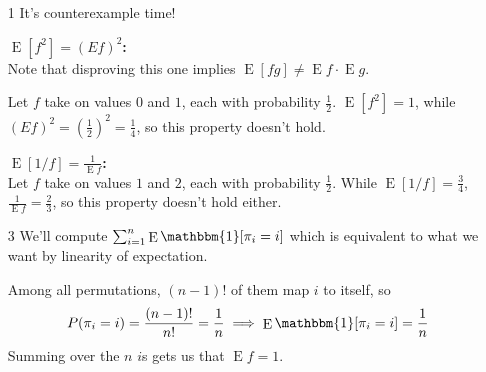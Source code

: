 \documentclass[12pt]{article}
\DeclareMathOperator{\E}{E}
\begin{document}
\begin{enumerate}
    \item[1] It's counterexample time!

        \textbf{$\E \left[f^2\right] = \left(E f\right)^2$:} \\
        Note that disproving this one implies  $\E [fg] \ne \E f \cdot \E g$.

        Let $f$ take on values $0$ and $1$, each with probability $\frac{1}{2}$.
        $\E \left[f^2\right]=1$, while $\left(E f\right)^2=\left(\frac{1}{2}\right)^2=\frac{1}{4}$,
        so this property doesn't hold.

        \textbf{$\E [1/f] = \frac{1}{\E f}$:} \\
        Let $f$ take on values $1$ and $2$, each with probability $\frac{1}{2}$.
        While $\E [1/f]=\frac{3}{4}$, $\frac{1}{\E f}=\frac{2}{3}$,
        so this property doesn't hold either.

    \item[3] We'll compute $\sum_{i=1}^{n} \E \mathbbm{1}[\pi_i=i]$ which is
        equivalent to what we want by linearity of expectation.

        Among all permutations, $(n-1)!$ of them map $i$ to itself, so
        \[P(\pi_i=i)=\frac{(n-1)!}{n!}=\frac{1}{n} \implies \E \mathbbm{1}[\pi_i=i]=\frac{1}{n}\]
        Summing over the $n$ $i$s gets us that $\E f=\boxed{1}$.
\end{enumerate}
\end{document}
